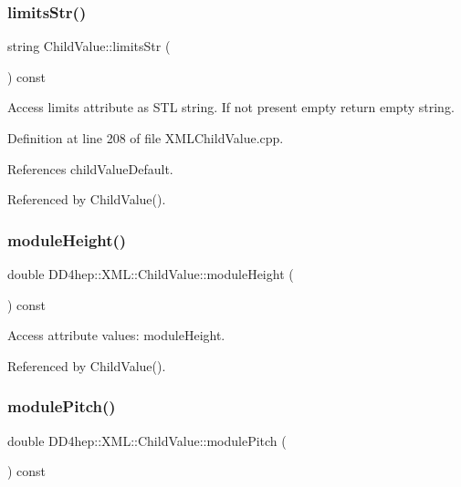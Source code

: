\subsubsection{\texorpdfstring{limits\+Str()}{limitsStr()}}
{\footnotesize\ttfamily string Child\+Value\+::limits\+Str (\begin{DoxyParamCaption}{ }\end{DoxyParamCaption}) const}



Access limits attribute as S\+TL string. If not present empty return empty string. 



Definition at line 208 of file X\+M\+L\+Child\+Value.\+cpp.



References child\+Value\+Default.



Referenced by Child\+Value().

\hypertarget{struct_d_d4hep_1_1_x_m_l_1_1_child_value_a038f0530e65d9c64493ab084d26b96f4}{}\label{struct_d_d4hep_1_1_x_m_l_1_1_child_value_a038f0530e65d9c64493ab084d26b96f4} 
\subsubsection{\texorpdfstring{module\+Height()}{moduleHeight()}}
{\footnotesize\ttfamily double D\+D4hep\+::\+X\+M\+L\+::\+Child\+Value\+::module\+Height (\begin{DoxyParamCaption}{ }\end{DoxyParamCaption}) const}



Access attribute values\+: module\+Height. 



Referenced by Child\+Value().

\hypertarget{struct_d_d4hep_1_1_x_m_l_1_1_child_value_a6a72ee5cbfa882b2a73ef8acddce79ca}{}\label{struct_d_d4hep_1_1_x_m_l_1_1_child_value_a6a72ee5cbfa882b2a73ef8acddce79ca} 
\subsubsection{\texorpdfstring{module\+Pitch()}{modulePitch()}}
{\footnotesize\ttfamily double D\+D4hep\+::\+X\+M\+L\+::\+Child\+Value\+::module\+Pitch (\begin{DoxyParamCaption}{ }\end{DoxyParamCaption}) const}



